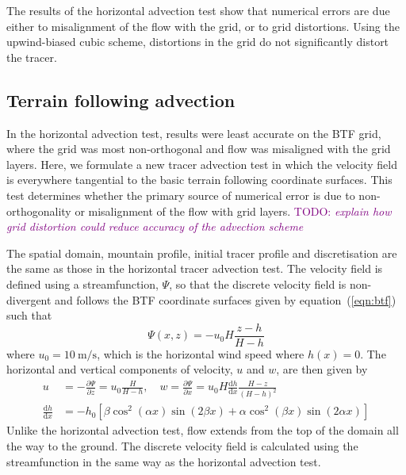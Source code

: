 \documentclass{ametsoc}
\newcommand{\TODO}[1]{\textcolor{purple}{TODO: \emph{#1}}}
\begin{document}
The results of the horizontal advection test show that numerical errors are due either to misalignment of the flow with the grid, or to grid distortions.  Using the upwind-biased cubic scheme, distortions in the grid do not significantly distort the tracer.


\subsection{Terrain following advection}
In the horizontal advection test, results were least accurate on the BTF grid, where the grid was most non-orthogonal and flow was misaligned with the grid layers.  Here, we formulate a new tracer advection test in which the velocity field is everywhere tangential to the basic terrain following coordinate surfaces.  This test determines whether the primary source of numerical error is due to non-orthogonality or misalignment of the flow with grid layers.  \TODO{explain how grid distortion could reduce accuracy of the advection scheme}

The spatial domain, mountain profile, initial tracer profile and discretisation are the same as those in the horizontal tracer advection test.  The velocity field is defined using a streamfunction, $\Psi$, so that the discrete velocity field is non-divergent and follows the BTF coordinate surfaces given by equation~(\ref{eqn:btf}) such that
\begin{equation}
	\Psi(x,z) = -u_0 H \frac{z - h}{H - h} \label{eqn:streamfunc-btf}
\end{equation}
where $u_0 = \SI{10}{\meter\per\second}$, which is the horizontal wind speed where $h(x) = 0$.
The horizontal and vertical components of velocity, $u$ and $w$, are then given by
\begin{align}
	u &= -\frac{\partial \Psi}{\partial z} = u_0 \frac{H}{H - h}, \quad w = \frac{\partial \Psi}{\partial x} = u_0 H \frac{\mathrm{d} h}{\mathrm{d} x} \frac{H - z}{\left( H - h \right)^2} \label{eqn:uw-btf} \\
	\frac{\mathrm{d} h}{\mathrm{d} x} &= - h_0 \left[ 
		\beta \cos^2 \left( \alpha x \right) \sin \left( 2 \beta x \right) +
		\alpha \cos^2 \left( \beta x \right) \sin \left( 2 \alpha x \right)
	\right]
\end{align}
Unlike the horizontal advection test, flow extends from the top of the domain all the way to the ground.  The discrete velocity field is calculated using the streamfunction in the same way as the horizontal advection test.
\end{document}
